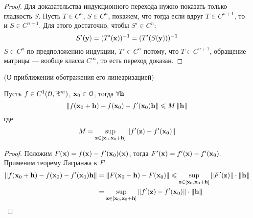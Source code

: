 \begin{proof}
    Для доказательства индукционного перехода нужно показать только
    гладкость $S$. Пусть $T \in C^n$, $S \in C^n$, покажем, что тогда если вдруг
    $T \in C^{n + 1}$, то и $S \in C^{n + 1}$. Для этого достаточно,
    чтобы $S' \in C^{n}$:
\[
    S'(\mathbf{y}) = (T'(\mathbf{x}))^{-1} = (T'(S(\mathbf{y})))^{-1}
\]
    $S \in C^n$ по предположению индукции, $T' \in C^n$ потому, что
    $T \in C^{n + 1}$, обращение матрицы --- вообще класса $C^{\infty}$, то есть
    переход доказан.
\end{proof}

\begin{lemma}(О приближении оботражения его линеаризацией)

    Пусть $f \in C^1(\mathcal{O}, \mathbb{R}^m)$, $\mathbf{x}_0 \in \mathcal{O}$, тогда $\forall \mathbf{h}$
\[
    \left\lVert f(\mathbf{x}_0 + \mathbf{h}) - f(\mathbf{x}_0) - f'(\mathbf{x}_0)\mathbf{h}\right\rVert \leqslant M \left\lVert\mathbf{h}\right\rVert
\]
    где
\[
    M = \sup_{\mathbf{z} \in [\mathbf{x}_0, \mathbf{x}_0 + \mathbf{h}]}{\left\lVert f'(\mathbf{z}) - f'(\mathbf{x}_0)\right\rVert}
\]
\end{lemma}
\begin{proof}
    Положим $F(\mathbf{x}) = f(\mathbf{x}) - f'(\mathbf{x}_0)(\mathbf{x})$, тогда $F'(\mathbf{x}) = f'(\mathbf{x}) - f'(\mathbf{x}_0)$.
    Применим теорему Лагранжа к $F$:
\begin{align*}
    \left\lVert f(\mathbf{x}_0 + \mathbf{h}) - f(\mathbf{x}_0) - f'(\mathbf{x}_0)\mathbf{h}\right\rVert &=
    \left\lVert F(\mathbf{x}_0 + \mathbf{h}) - F(\mathbf{x}_0)\right\rVert \leqslant \sup_{\mathbf{z} \in [\mathbf{x}_0, \mathbf{x}_0 + \mathbf{h}]}
    {\left\lVert F'(\mathbf{z})\right\rVert} \cdot \left\lVert\mathbf{h}\right\rVert \\
    &= \sup_{\mathbf{z} \in [\mathbf{x}_0, \mathbf{x}_0 + \mathbf{h}]} {\left\lVert f'(\mathbf{z}) - f'(\mathbf{x}_0)\right\rVert} \cdot \left\lVert\mathbf{h}\right\rVert
\end{align*}
\end{proof}


